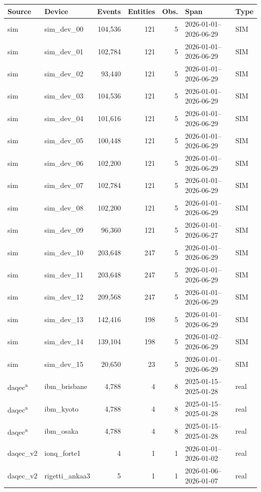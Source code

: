\begin{tabular}{llrrrll}
\toprule
Source & Device & Events & Entities & Obs. & Span & Type \\
\midrule
sim & sim\_dev\_00 & 104,536 & 121 & 5 & 2026-01-01--2026-06-29 & SIM \\
sim & sim\_dev\_01 & 102,784 & 121 & 5 & 2026-01-01--2026-06-29 & SIM \\
sim & sim\_dev\_02 & 93,440 & 121 & 5 & 2026-01-01--2026-06-29 & SIM \\
sim & sim\_dev\_03 & 104,536 & 121 & 5 & 2026-01-01--2026-06-29 & SIM \\
sim & sim\_dev\_04 & 101,616 & 121 & 5 & 2026-01-01--2026-06-29 & SIM \\
sim & sim\_dev\_05 & 100,448 & 121 & 5 & 2026-01-01--2026-06-29 & SIM \\
sim & sim\_dev\_06 & 102,200 & 121 & 5 & 2026-01-01--2026-06-29 & SIM \\
sim & sim\_dev\_07 & 102,784 & 121 & 5 & 2026-01-01--2026-06-29 & SIM \\
sim & sim\_dev\_08 & 102,200 & 121 & 5 & 2026-01-01--2026-06-29 & SIM \\
sim & sim\_dev\_09 & 96,360 & 121 & 5 & 2026-01-01--2026-06-27 & SIM \\
sim & sim\_dev\_10 & 203,648 & 247 & 5 & 2026-01-01--2026-06-29 & SIM \\
sim & sim\_dev\_11 & 203,648 & 247 & 5 & 2026-01-01--2026-06-29 & SIM \\
sim & sim\_dev\_12 & 209,568 & 247 & 5 & 2026-01-01--2026-06-29 & SIM \\
sim & sim\_dev\_13 & 142,416 & 198 & 5 & 2026-01-01--2026-06-29 & SIM \\
sim & sim\_dev\_14 & 139,104 & 198 & 5 & 2026-01-02--2026-06-29 & SIM \\
sim & sim\_dev\_15 & 20,650 & 23 & 5 & 2026-01-01--2026-06-29 & SIM \\
daqec\textsuperscript{a} & ibm\_brisbane & 4,788 & 4 & 8 & 2025-01-15--2025-01-28 & real \\
daqec\textsuperscript{a} & ibm\_kyoto & 4,788 & 4 & 8 & 2025-01-15--2025-01-28 & real \\
daqec\textsuperscript{a} & ibm\_osaka & 4,788 & 4 & 8 & 2025-01-15--2025-01-28 & real \\
daqec\_v2 & ionq\_forte1 & 4 & 1 & 1 & 2026-01-01--2026-01-02 & real \\
daqec\_v2 & rigetti\_ankaa3 & 5 & 1 & 1 & 2026-01-06--2026-01-07 & real \\

\end{tabular}
